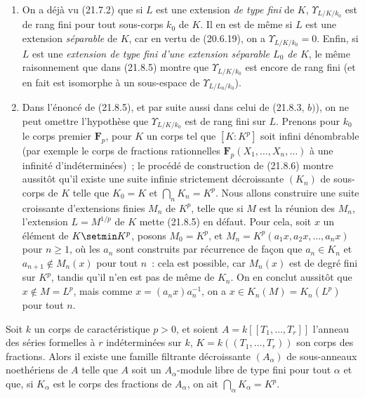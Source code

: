 \begin{remarks}[21.8.7]
\label{0.21.8.7-fr}
\begin{enumerate}
  \item[(i)] On a déjà vu (21.7.2) que si $L$ est une extension
  \emph{de type fini} de $K$, $\Upsilon_{L/K/k_0}$ est de rang fini pour tout
  sous-corps $k_0$ de $K$. Il en est de même si $L$ est une extension
  \emph{séparable} de $K$, car en vertu de (20.6.19), on a
  $\Upsilon_{L/K/k_0}=0$. Enfin, si $L$ est une \emph{extension de type fini
  d'une extension séparable $L_0$ de $K$}, le même raisonnement que dans
  (21.8.5) montre que $\Upsilon_{L/K/k_0}$ est encore de rang fini (et en fait
  est isomorphe à un sous-espace de $\Upsilon_{L/L_0/k_0}$).

  \item[(ii)] Dans l'énoncé de (21.8.5), et par suite aussi dans celui de
  (21.8.3, $b)$), on ne peut omettre l'hypothèse que $\Upsilon_{L/K/k_0}$ est
  de rang fini sur $L$. Prenons pour $k_0$ le corps premier $\mathbf F_p$,
  pour $K$ un corps tel que $[K:K^p]$ soit infini dénombrable (par exemple le
  corps de fractions rationnelles $\mathbf F_p(X_1,\ldots,X_n,\ldots)$ à une
  infinité d'indéterminées)~; le procédé de construction de (21.8.6) montre
  aussitôt qu'il existe une suite infinie strictement décroissante $(K_n)$ de
  sous-corps de $K$ telle que $K_0=K$ et $\bigcap_nK_n=K^p$. Nous allons
  construire une suite croissante d'extensions finies $M_n$ de $K^p$, telle que
  si $M$ est la réunion des $M_n$, l'extension $L=M^{1/p}$ de $K$ mette
  (21.8.5) en défaut. Pour cela, soit $x$ un élément de $K\setmin K^p$, posons
  $M_0=K^p$, et $M_n=K^p(a_1x,a_2x,\ldots,a_nx)$ pour $n\geqslant1$, où les
  $a_n$ sont construits par récurrence de façon que $a_n\in K_n$ et
  $a_{n+1}\notin M_n(x)$ pour tout $n$~: cela est possible, car $M_n(x)$ est
  de degré fini sur $K^p$, tandis qu'il n'en est pas de même de $K_n$. On en
  conclut aussitôt que $x\notin M=L^p$, mais comme
  $x=(a_nx)a_n^{-1}$, on a $x\in K_n(M)=K_n(L^p)$ pour tout $n$.
\end{enumerate}
\end{remarks}

\begin{proposition}[21.8.8]
\label{0.21.8.8-fr}
Soit $k$ un corps de caractéristique $p>0$, et soient
$A=k[[T_1,\ldots,T_r]]$ l'anneau des séries formelles à $r$ indéterminées sur
$k$, $K=k((T_1,\ldots,T_r))$ son corps des fractions. Alors il existe une
famille filtrante décroissante $(A_\alpha)$ de sous-anneaux noethériens de $A$
telle que $A$ soit un $A_\alpha$-module libre de type fini pour tout $\alpha$
et que, si $K_\alpha$ est le corps des fractions de $A_\alpha$, on ait
$\bigcap_\alpha K_\alpha=K^p$.
\end{proposition}

